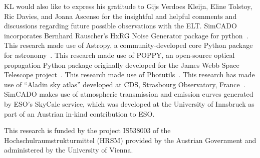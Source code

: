 \documentclass{aa}
\begin{document}



\begin{acknowledgements}

KL would also like to express his gratitude to Gijs Verdoes Kleijn, Eline Tolstoy, Ric Davies, and Joana Ascenso for the insightful and helpful comments and discussions regarding future possible observations with the ELT\@.
SimCADO incorporates Bernhard Rauscher's HxRG Noise Generator package for python~\citep{nghxrg}.
This research made use of Astropy, a community-developed core Python package for astronomy~\citep{astropy, astropy2}.
This research made use of POPPY, an open-source optical propagation Python package originally developed for the James Webb Space Telescope project~\citep{poppy}.
This research made use of Photutils~\citep{photutils}.
This research has made use of ``Aladin sky atlas'' developed at CDS, Strasbourg Observatory, France~\citep{aladin, aladinlite}.
SimCADO makes use of atmospheric transmission and emission curves generated by ESO's SkyCalc service, which was developed at the University of Innsbruck as part of an Austrian in-kind contribution to ESO\@.

This research is funded by the project IS538003 of the Hochschulraumstrukturmittel (HRSM) provided by the Austrian Government and administered by the University of Vienna.

\end{acknowledgements}







\end{document}
